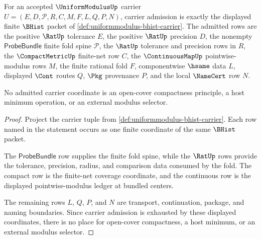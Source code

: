 \begin{theorem}
\label{thm:uniformmodulus-modulus-carrier-obligation}
For an accepted $\UniformModulusUp$ carrier $U=(E,D,\mathcal{P},R,C,M,F,L,Q,P,N)$, carrier admission is exactly the displayed finite $\BHist$ packet of \autoref{def:uniformmodulus-bhist-carrier}. The admitted rows are the positive $\RatUp$ tolerance $E$, the positive $\RatUp$ precision $D$, the nonempty $\mathsf{ProbeBundle}$ finite fold spine $\mathcal{P}$, the $\RatUp$ tolerance and precision rows in $R$, the $\CompactMetricUp$ finite-net row $C$, the $\ContinuousMapUp$ pointwise-modulus rows $M$, the finite rational fold $F$, componentwise $\hsame$ data $L$, displayed $\Cont$ routes $Q$, $\Pkg$ provenance $P$, and the local $\NameCert$ row $N$.

No admitted carrier coordinate is an open-cover compactness principle, a host minimum operation, or an external modulus selector.
\end{theorem}
\begin{proof}
Project the carrier tuple from \autoref{def:uniformmodulus-bhist-carrier}. Each row named in the statement occurs as one finite coordinate of the same $\BHist$ packet.

The $\mathsf{ProbeBundle}$ row supplies the finite fold spine, while the $\RatUp$ rows provide the tolerance, precision, radius, and comparison data consumed by the fold. The compact row is the finite-net coverage coordinate, and the continuous row is the displayed pointwise-modulus ledger at bundled centers.

The remaining rows $L$, $Q$, $P$, and $N$ are transport, continuation, package, and naming boundaries. Since carrier admission is exhausted by these displayed coordinates, there is no place for open-cover compactness, a host minimum, or an external modulus selector.
\end{proof}

